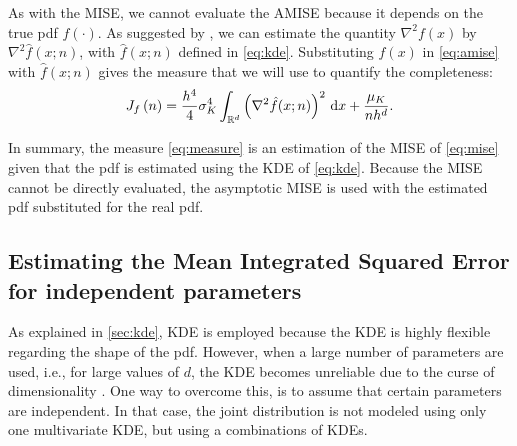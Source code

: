 As with the MISE, we cannot evaluate the AMISE because it depends on the true pdf $f(\cdot)$. As suggested by \textcite{chen2017tutorial, calonico2018effect}, we can estimate the quantity $\nabla^2 f(x)$ by $\nabla^2 \hat{f}(x;n)$, with $\hat{f}(x;n)$ defined in \cref{eq:kde}. 
Substituting $f(x)$ in \cref{eq:amise} with $\hat{f}(x;n)$ gives the measure that we will use to quantify the completeness:
\begin{equation}
	\label{eq:measure}
	J_{f} \left( n \right) = \frac{h^4}{4} \sigma_K^4 \int_{\mathbb{R}^d} \left( \nabla^2 \hat{f}(x;n) \right)^2 \mathrm{\,d} x + \frac{\mu_K}{nh^d}.
\end{equation}

In summary, the measure \cref{eq:measure} is an estimation of the MISE of \cref{eq:mise} given that the pdf is estimated using the KDE of \cref{eq:kde}. Because the MISE cannot be directly evaluated, the asymptotic MISE is used with the estimated pdf substituted for the real pdf. 

\subsection{Estimating the Mean Integrated Squared Error for independent parameters}
\label{sec:mise independent}

As explained in \cref{sec:kde}, KDE is employed because the KDE is highly flexible regarding the shape of the pdf. However, when a large number of parameters are used, i.e., for large values of $d$, the KDE becomes unreliable due to the curse of dimensionality \cite{scott2015multivariate}. One way to overcome this, is to assume that certain parameters are independent. 
In that case, the joint distribution is not modeled using only one multivariate KDE, but using a combinations of KDEs.

